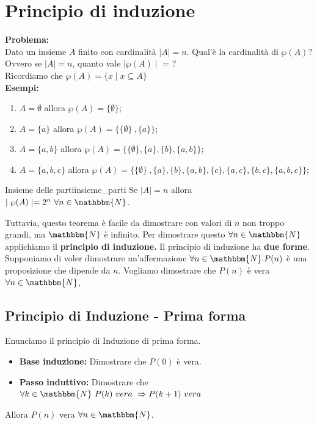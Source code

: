 \documentclass[12pt, letterpaper]{report}
\newcounter{theorem}
\newcommand{\nmu}{}
\begin{document}
		\chapter{Principio di induzione}
		\textbf{\color{red}Problema:}
		\\
		Dato un insieme $A$ finito con cardinalità $\mid A \mid = n$.
		Qual'è la cardinalità di $\wp(A)$? Ovvero se $\mid A \mid = n$, quanto vale $\mid \wp(A) \mid$ = ?
		\\
		Ricordiamo che $\wp(A) = \{x \mid x \subseteq A\}$
		\\
		\textbf{Esempi:}
		\begin{enumerate}
			\item $A = \emptyset$ allora $\wp(A) = \{\emptyset\}$;
			\item $A = \{a\}$ allora $\wp(A) = \{\{\emptyset\}\ , \{a\}\}$;
			\item $A = \{a, b\}$ allora $\wp(A) = \{\{\emptyset\}, \{a\}, \{b\}, \{a, b\}\}$;

			\item $A = \{a, b, c\}$ allora $\wp(A) = \{\{\emptyset\}\ , \{a\}, \{b\}, \{a, b\}, \{c\}, \{a, c\}, \{b, c\}, \{a,b,c\}\}$;
		\end{enumerate}
		\begin{theorem}{\nmu Insieme delle parti}{insieme_parti}
			Se $\mid A \mid = n$ allora $\mid \wp(A) \mid = 2^n \ \forall n \in \mathbbm{N}$.
		\end{theorem}
		Tuttavia, questo teorema è facile da dimostrare con valori di $n$ non troppo grandi, ma $\mathbbm{N}$ è infinito.
		Per dimostrare questo $\forall n \in \mathbbm{N}$ applichiamo il \textbf{principio di induzione.}
		Il principio di induzione ha \textbf{due forme}.
		\\ Supponiamo di voler dimostrare un'affermazione $\forall n \in \mathbbm{N}. \\P(n)$ è una proposizione che dipende da $n$.
		Vogliamo dimostrare che $P(n)$ è vera $\forall n \in \mathbbm{N}$.
		\section{Principio di Induzione - Prima forma}
		Enunciamo il principio di Induzione di prima forma.
		\begin{itemize}
			\item \textbf{Base induzione:} Dimostrare che $P(0)$ è vera.
			\item \textbf{Passo induttivo:} Dimostrare che $\forall k \in \mathbbm{N} \ P(k) \ vera \ \Rightarrow P(k + 1) \ vera$
		\end{itemize}
		Allora $P(n)$ vera $\forall n \in \mathbbm{N}$.
\end{document}

